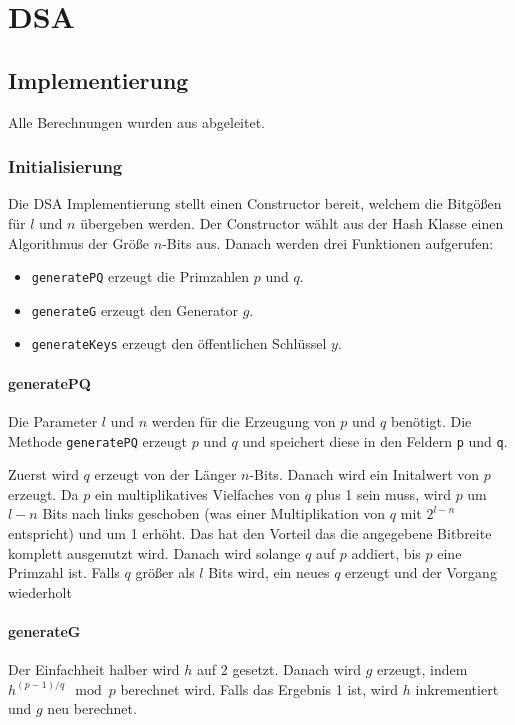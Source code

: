 \chapter{DSA}

\section{Implementierung}

Alle Berechnungen wurden aus \cite{enwiki:1194947270} abgeleitet.

\subsection{Initialisierung}
Die DSA Implementierung stellt einen Constructor bereit, welchem die Bitgößen für $l$ und $n$ übergeben werden. Der Constructor wählt aus der Hash Klasse einen Algorithmus der Größe $n$-Bits aus. Danach werden drei Funktionen aufgerufen:
\begin{itemize}
    \item \texttt{generatePQ} erzeugt die Primzahlen $p$ und $q$.
    \item \texttt{generateG} erzeugt den Generator $g$.
    \item \texttt{generateKeys} erzeugt den öffentlichen Schlüssel $y$.
\end{itemize}

\subsubsection{generatePQ}
Die Parameter $l$ und $n$ werden für die Erzeugung von $p$ und $q$ benötigt. Die Methode \texttt{generatePQ} erzeugt $p$ und $q$ und speichert diese in den Feldern \texttt{p} und \texttt{q}.

Zuerst wird $q$ erzeugt von der Länger $n$-Bits. Danach wird ein Initalwert von $p$ erzeugt. Da $p$ ein multiplikatives Vielfaches von $q$ plus 1 sein muss, wird $p$ um $l-n$ Bits nach links geschoben (was einer Multiplikation von $q$ mit $2^{l-n}$ entspricht) und um 1 erhöht. Das hat den Vorteil das die angegebene Bitbreite komplett ausgenutzt wird. Danach wird solange $q$ auf $p$ addiert, bis $p$ eine Primzahl ist.
Falls $q$ größer als $l$ Bits wird, ein neues $q$ erzeugt und der Vorgang wiederholt

\subsubsection{generateG}
Der Einfachheit halber wird $h$ auf 2 gesetzt. Danach wird $g$ erzeugt, indem $h^{(p-1)/q} \mod p$ berechnet wird. Falls das Ergebnis 1 ist, wird $h$ inkrementiert und $g$ neu berechnet.

